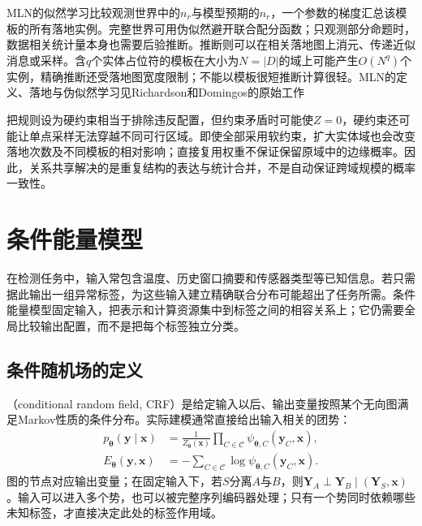 MLN的似然学习比较观测世界中的$n_r$与模型预期的$n_r$，一个参数的梯度汇总该模板的所有落地实例。完整世界可用伪似然避开联合配分函数；只观测部分命题时，数据相关统计量本身也需要后验推断。推断则可以在相关落地图上消元、传递近似消息或采样。含$q$个实体占位符的模板在大小为$N=|D|$的域上可能产生$O(N^q)$个实例，精确推断还受落地图宽度限制；不能以模板很短推断计算很轻。MLN的定义、落地与伪似然学习见Richardson和Domingos的原始工作

把规则设为硬约束相当于排除违反配置，但约束矛盾时可能使$Z=0$，硬约束还可能让单点采样无法穿越不同可行区域。即使全部采用软约束，扩大实体域也会改变落地次数及不同模板的相对影响；直接复用权重不保证保留原域中的边缘概率。因此，关系共享解决的是重复结构的表达与统计合并，不是自动保证跨域规模的概率一致性。

\section{条件能量模型}
\label{sec:pgm-energy-models-conditional-models}

在检测任务中，输入常包含温度、历史窗口摘要和传感器类型等已知信息。若只需据此输出一组异常标签，为这些输入建立精确联合分布可能超出了任务所需。条件能量模型固定输入，把表示和计算资源集中到标签之间的相容关系上；它仍需要全局比较输出配置，而不是把每个标签独立分类。

\subsection{条件随机场的定义}
\label{sec:pgm-energy-models-crf-definition}

（conditional random field, CRF）是给定输入以后、输出变量按照某个无向图满足Markov性质的条件分布。实际建模通常直接给出输入相关的团势：
\begin{equation}
  \begin{aligned}
    p_{\bm{\theta}}(\bm{y}\mid\bm{x})
      &=\frac{1}{Z_{\bm{\theta}}(\bm{x})}
          \prod_{C\in\mathcal{C}}
             \psi_{\bm{\theta},C}(\bm{y}_C,\bm{x}),\\
    E_{\bm{\theta}}(\bm{y},\bm{x})
      &=-\sum_{C\in\mathcal{C}}
             \log\psi_{\bm{\theta},C}(\bm{y}_C,\bm{x}).
  \end{aligned}
  \label{eq:pgm-energy-models-crf-factors}
\end{equation}
图的节点对应输出变量；在固定输入下，若$S$分离$A$与$B$，则$\bm{Y}_A\perp\bm{Y}_B\mid(\bm{Y}_S,\bm{x})$。输入可以进入多个势，也可以被完整序列编码器处理；只有一个势同时依赖哪些未知标签，才直接决定此处的标签作用域。

